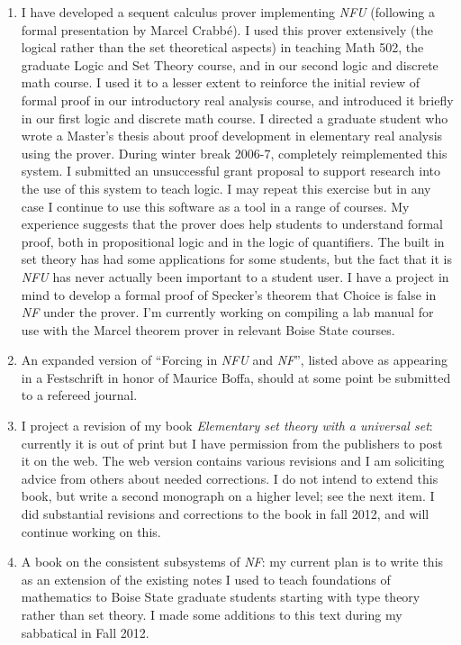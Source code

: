 \begin{description}
\begin{enumerate}
\item I have developed a sequent calculus prover implementing {\em
NFU\/} (following a formal presentation by Marcel Crabb\'e).  I used
this prover extensively (the logical rather than the set theoretical
aspects) in teaching Math 502, the graduate Logic and Set Theory
course, and in our second logic and discrete math course.  I used it
to a lesser extent to reinforce the initial review of formal proof in
our introductory real analysis course, and introduced it briefly in
our first logic and discrete math course.  I directed a graduate
student who wrote a Master's thesis about proof development in
elementary real analysis using the prover.  During winter break
2006-7, completely reimplemented this system.  I submitted an
unsuccessful grant proposal to support research into the use of this
system to teach logic.  I may repeat this exercise but in any case I
continue to use this software as a tool in a range of courses.  My
experience suggests that the prover does help students to understand
formal proof, both in propositional logic and in the logic of
quantifiers.  The built in set theory has had some applications for
some students, but the fact that it is {\em NFU\/} has never actually
been important to a student user.  I have a project in mind to develop
a formal proof of Specker's theorem that Choice is false in {\em NF\/}
under the prover.  I'm currently working on compiling a lab manual for use with the Marcel theorem prover in relevant Boise State courses.

\item An expanded version of ``Forcing in {\em NFU\/} and {\em
NF\/}'', listed above as appearing in a Festschrift in honor of
Maurice Boffa, should at some point be submitted to a refereed
journal.

\item I project a revision of my book {\em Elementary set theory with
a universal set\/}: currently it is out of print but I have permission
from the publishers to post it on the web.  The web version contains
various revisions and I am soliciting advice from others about needed
corrections.  I do not intend to extend this book, but write a second
monograph on a higher level; see the next item.  I did substantial revisions and corrections to the book in fall 2012, and will continue working on this.

\item A book on the consistent subsystems of {\em NF\/}: my current
plan is to write this as an extension of the existing notes I used to
teach foundations of mathematics to Boise State graduate students
starting with type theory rather than set theory.  I made some additions to this text during my sabbatical in Fall 2012.


\end{enumerate}
\end{description}
